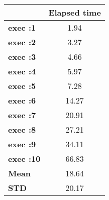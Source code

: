 \begin{tiny}\begin{tabular}{|l|c|}
\hline
&\textbf{Elapsed time}\\\hline
\textbf{exec :1}&1.94\\\hline
\textbf{exec :2}&3.27\\\hline
\textbf{exec :3}&4.66\\\hline
\textbf{exec :4}&5.97\\\hline
\textbf{exec :5}&7.28\\\hline
\textbf{exec :6}&14.27\\\hline
\textbf{exec :7}&20.91\\\hline
\textbf{exec :8}&27.21\\\hline
\textbf{exec :9}&34.11\\\hline
\textbf{exec :10}&66.83\\\hline
\textbf{ Mean}&18.64\\\hline
\textbf{ STD}&20.17\\\hline
\end{tabular}
\end{tiny}